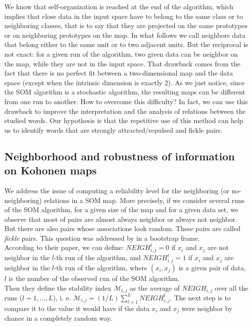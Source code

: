 \documentclass{elsarticle}
\begin{document}
We know that self-organization is reached at the end of the algorithm, which implies that close data in the input space have to belong to the same class or to neighboring classes, that is to say that they are projected on the same prototypes or on neighboring prototypes on the map. In what follows we call neighbors data that belong either to the same unit or to two adjacent units. But the reciprocal is not exact: for a given run of the algorithm, two given data can be neighbor on the map, while they are not in the input space. That drawback comes from the fact that there is no perfect fit between a two-dimensional map and the data space (except when the intrinsic dimension is exactly 2). As we just notice, since the SOM algorithm is a stochastic algorithm, the resulting maps can be different from one run to another. How to overcome this difficulty? In fact, we can use this drawback to improve the interpretation and the analysis of relations between the studied words. Our hypothesis is that the repetitive use of this method can help us to identify words that are strongly attracted/repulsed and fickle pairs.

\subsection{Neighborhood and robustness of information on Kohonen maps}

We address the issue of computing a reliability level for the neighboring (or no-neighboring) relations in a SOM map. More precisely, if we consider several runs of the SOM algorithm, for a given size of the map and for a given data set, we observe that most of pairs are almost always neighbor or always not neighbor. But there are also pairs whose associations look random. These pairs are called \textit{fickle} pairs. This question was addressed by \cite{debodt02} in a bootstrap frame.\\

According to their paper, we can define:
$NEIGH_{i,j}^l=0$ if $x_i$ and $x_j$ are not neighbor in the $l$-th run of the algorithm, and 
$NEIGH_{i,j}^l=1$ if $x_i$ and $x_j$ are neighbor in the $l$-th run of the algorithm, 
where $(x_i, x_j)$ is a given pair of data, $l$ is the number of the observed run of the SOM algorithm.\\

Then they define the stability index $\mathcal{M}_{i,j}$ as the average of $NEIGH_{i,j}$ over all the runs ($l=1, \hdots, L$), i. e. 
$\mathcal{M}_{i,j} = (1/L)\sum_{l=1}^L NEIGH_{i,j}^l$. The next step is to compare it to the value it would have if the data $x_i$ and $x_j$ were neighbor by chance in a completely random way.\\
\end{document}
